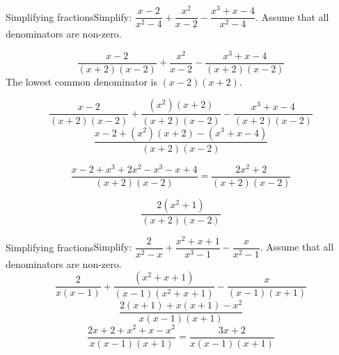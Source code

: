       
\begin{wex}{Simplifying fractions}{Simplify: $\dfrac{x-2}{{x}^{2}-4}+\dfrac{{x}^{2}}{x-2}-\dfrac{{x}^{3}+x-4}{{x}^{2}-4}$. Assume that all denominators are non-zero.}
{
\begin{equation*}
\frac{x-2}{(x+2)(x-2)}+\frac{{x}^{2}}{x-2}-\frac{{x}^{3}+x-4}{(x+2)(x-2)}
\end{equation*}
 The lowest common denominator is $(x-2)(x+2)$. 

\begin{equation*}
\frac{x-2}{(x+2)(x-2)}+\frac{({x}^{2})
(x+2)}{(x+2)(x-2)}-\frac{{x}^{3}+x-4}{(x+2)(x-2)}
\end{equation*}
\begin{equation*}
\frac{x-2+({x}^{2})(x+2)-(x^{3}+x-4)}{(x+2)(x-2)}
\end{equation*}

\begin{equation*}
  \dfrac{x-2+{x}^{3}+ 2x^{2}-x^{3} - x+4}{(x+2)(x-2)} = \dfrac{2x^{2} + 2}{(x+2)(x-2)}
\end{equation*}

\begin{equation*}
\dfrac{2({x}^{2}
+1)}{(x+2)(x-2)}
\end{equation*}
}
\end{wex}

\begin{wex}{Simplifying fractions}{Simplify: $\dfrac{2}{{x}^{2}-x}+\dfrac{x^{2}+x+1}{x^{3}-1}-\dfrac{x}{{x}^{2}-1}$. Assume that all denominators are non-zero.}
{
\begin{equation*}
  \dfrac{2}{x(x-1)}+ \dfrac{({x}^{2} + x + 1)}{(x-1)(x^{2}+x+1)}-\dfrac{x}{(x-1)(x+1)}
\end{equation*}
\begin{equation*}
  \dfrac{2(x+1)+x(x+1)-x^{2}}{x(x-1)(x+1)}
\end{equation*}
\begin{equation*}
  \dfrac{2x+2 + x^{2} + x - x^{2}}{x(x-1)(x+1)} = \dfrac{3x+2}{x(x-1)(x+1)}
\end{equation*}
}
\end{wex}


